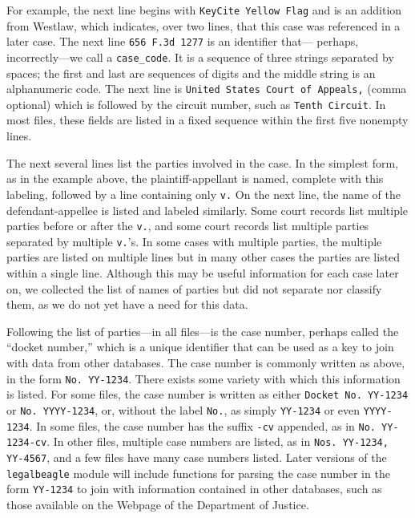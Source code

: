 \documentclass[11pt]{paper}
\begin{document}
For example, the next line begins with \texttt{KeyCite Yellow Flag} 
and is an addition from Westlaw, 
which indicates, over two lines, that this case was referenced in a later case. 
The next line \texttt{656 F.3d 1277} is an identifier that---%
perhaps, incorrectly---we call a \texttt{case\_code}. 
It is a sequence of three strings separated by spaces; 
the first and last are sequences of digits 
and the middle string is an alphanumeric code. 
The next line is \texttt{United States Court of Appeals,} (comma optional) 
which is followed by the circuit number, such as \texttt{Tenth Circuit}. 
In most files, these fields are listed in a fixed sequence 
within the first five nonempty lines. 

The next several lines list the parties involved in the case. 
In the simplest form, as in the example above, 
the plaintiff-appellant is named, complete with this labeling, 
followed by a line containing only \texttt{v.}
On the next line, 
the name of the defendant-appellee is listed and labeled similarly. 
Some court records list multiple parties before or after the \texttt{v.}, and 
some court records list multiple parties separated by multiple \texttt{v.}'s. 
In some cases with multiple parties, the multiple parties are listed on
multiple lines but in many other cases 
the parties are listed within a single line. 
Although this may be useful information for each case later on, 
we collected the list of names of parties 
but did not separate nor classify them, 
as we do not yet have a need for this data.

Following the list of parties---in all files---is the case number, 
perhaps called the ``docket number,''
which is a unique identifier that can be used as a key 
to join with data from other databases. 
The case number is commonly written as above, 
in the form \texttt{No. YY-1234}. 
There exists some variety with which this information is listed. 
For some files, the case number is written as either \texttt{Docket No. YY-1234}
or \texttt{No. YYYY-1234}, or, without the label \texttt{No.}, 
as simply \texttt{YY-1234} or even \texttt{YYYY-1234}. 
In some files, the case number has the suffix \texttt{-cv} appended, 
as in \texttt{No. YY-1234-cv}. 
In other files, multiple case numbers are listed, 
as in \texttt{Nos. YY-1234, YY-4567}, 
and a few files have many case numbers listed. 
Later versions of the \texttt{legalbeagle} module will include 
functions for parsing the case number in the form \texttt{YY-1234}
to join with information contained in other databases, 
such as those available on the Webpage of the Department of Justice.
\end{document}
